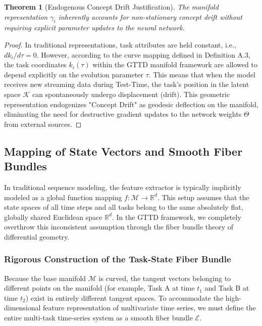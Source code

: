 \documentclass{article}
\newtheorem{theorem}{Theorem}[section]
\begin{document}
\begin{theorem}[Endogenous Concept Drift Justification]
The manifold representation $\gamma_i$ inherently accounts for non-stationary concept drift without requiring explicit parameter updates to the neural network.
\end{theorem}

\begin{proof}
In traditional representations, task attributes are held constant, i.e., $dk_i/d\tau = 0$. However, according to the curve mapping defined in Definition A.3, the task coordinates $k_i(\tau)$ within the GTTD manifold framework are allowed to depend explicitly on the evolution parameter $\tau$. This means that when the model receives new streaming data during Test-Time, the task's position in the latent space $\mathcal{K}$ can spontaneously undergo displacement (drift). This geometric representation endogenizes "Concept Drift" as geodesic deflection on the manifold, eliminating the need for destructive gradient updates to the network weights $\Theta$ from external sources.
\end{proof}

\subsection{Mapping of State Vectors and Smooth Fiber Bundles}

In traditional sequence modeling, the feature extractor is typically implicitly modeled as a global function mapping $f: \mathcal{M} \to \mathbb{R}^d$. This setup assumes that the state spaces of all time steps and all tasks belong to the same absolutely flat, globally shared Euclidean space $\mathbb{R}^d$. In the GTTD framework, we completely overthrow this inconsistent assumption through the fiber bundle theory of differential geometry.

\subsubsection{Rigorous Construction of the Task-State Fiber Bundle}

Because the base manifold $\mathcal{M}$ is curved, the tangent vectors belonging to different points on the manifold (for example, Task A at time $t_1$ and Task B at time $t_2$) exist in entirely different tangent spaces. To accommodate the high-dimensional feature representation of multivariate time series, we must define the entire multi-task time-series system as a smooth fiber bundle $\mathcal{E}$.
\end{document}
